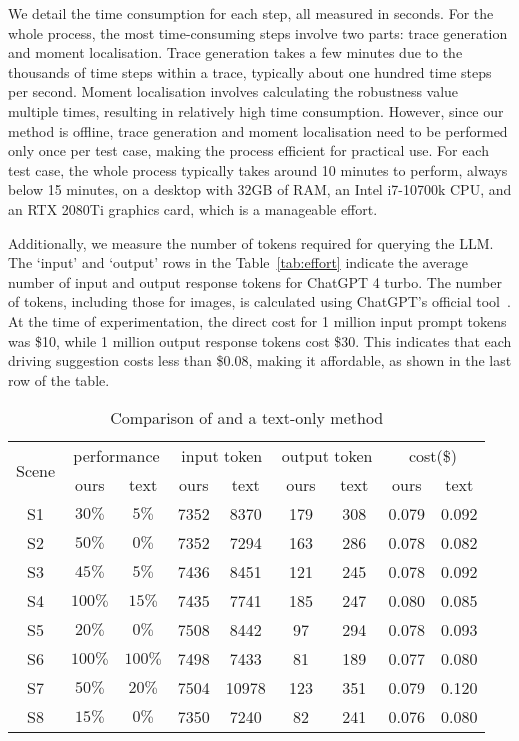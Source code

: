 We detail the time consumption for each step, all measured in seconds. For the whole process, the most time-consuming steps involve two parts: trace generation and moment localisation. Trace generation takes a few minutes due to the thousands of time steps within a trace, typically about one hundred time steps per second. Moment localisation involves calculating the robustness value multiple times, resulting in relatively high time consumption. However, since our method is offline, trace generation and moment localisation need to be performed only once per test case, making the process efficient for practical use. For each test case, the whole process typically takes around 10 minutes to perform, always below 15 minutes, on a desktop with 32GB of RAM, an Intel i7-10700k CPU, and an RTX 2080Ti graphics card, which is a manageable effort.

Additionally, we measure the number of tokens required for querying the LLM. The `input' and `output' rows in the Table~\ref{tab:effort} indicate the average number of input and output response tokens for ChatGPT 4 turbo.  
The number of tokens, including those for images, is calculated using ChatGPT's official tool~\cite{tokenizer_web}.
At the time of experimentation, the direct cost for 1 million input prompt tokens was \$10, while 1 million output response tokens cost \$30. This indicates that each driving suggestion costs less than \$0.08, making it affordable, as shown in the last row of the table.


\begin{table}[h]
\centering
\caption{Comparison of \coolname and a text-only method}
\vspace{-0.2cm}\scriptsize
\label{tab:images_text_transposed}
\begin{tabular}{|c|c|c|c|c|c|c|c|c|}
\hline
\multirow{2}{*}{Scene} & \multicolumn{2}{c|}{performance} & \multicolumn{2}{c|}{input token} & \multicolumn{2}{c|}{output token} & \multicolumn{2}{c|}{cost(\$)} \\ \cline{2-9}
 & ours & text & ours & text & ours & text & ours & text\\ 
\hline
S1 & $30\%$ & $5\%$     & 7352  & 8370 & 179& 308 & 0.079 & 0.092\\ \hline
S2 & $50\%$ & $0\%$     & 7352  & 7294 & 163& 286 & 0.078 & 0.082\\ \hline
S3 & $45\%$ & $5\%$     & 7436  & 8451 & 121& 245 & 0.078 & 0.092\\ \hline
S4 & $100\%$ & $15\%$   & 7435  & 7741 & 185& 247 & 0.080 & 0.085\\ \hline
S5 & $20\%$ & $0\%$     & 7508  & 8442 & 97 & 294 & 0.078 & 0.093\\ \hline
S6 & $100\%$ & $100\%$  & 7498  & 7433 & 81 & 189 & 0.077 & 0.080\\ \hline
S7 & $50\%$ & $20\%$    & 7504  & 10978& 123& 351 & 0.079 & 0.120\\ \hline
S8 & $15\%$ & $0\%$     & 7350  & 7240 & 82 & 241 & 0.076 & 0.080\\ \hline
\end{tabular}%
\vspace{-0.3cm}
\end{table}


